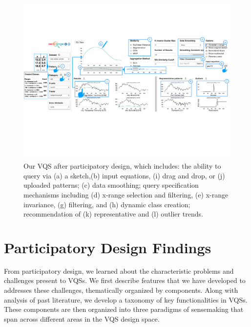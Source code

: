 \begin{figure}[ht!]
\centering
\vspace{-15pt}
\includegraphics[width=\linewidth]{figures/system.pdf} %
\vspace{-5pt}\caption{Our VQS after participatory design, which includes: the ability to query via (a) a sketch,(b) input equations, (i) drag and drop, or (j) uploaded patterns; (c) data smoothing; query specification mechanisms including (d) x-range selection and filtering, (e) x-range invariance, (g) filtering, and (h) dynamic class creation; recommendation of (k) representative and (l) outlier trends.} %
\label{zvOverview}
\vspace{-14pt}
\end{figure}
\section{Participatory Design Findings\label{sec:pd_findings}}
From participatory design, we learned about the characteristic problems and challenges present to VQSs. We first describe features that we have developed to addresses these challenges, thematically organized by components. %
Along with analysis of past literature, we develop a taxonomy of key functionalities in VQSs. These components are then organized into three paradigms of sensemaking that span across different areas in the VQS design space.
